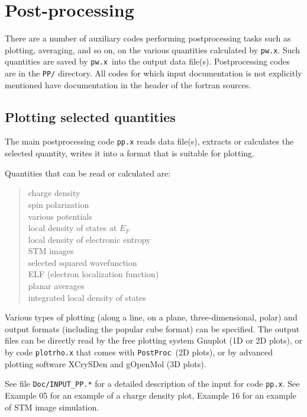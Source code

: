 \documentclass[12pt,a4paper]{article}
\def\pw.x{\texttt{pw.x}}
\def\PostProc{\texttt{PostProc}}
\begin{document}
\section{Post-processing}

There are a number of auxiliary codes performing postprocessing tasks such
as plotting, averaging, and so on, on the various quantities calculated by
\pw.x. Such quantities are saved by \pw.x\ into the output data file(s). 
Postprocessing codes are in the \texttt{PP/} directory. All codes for 
which input documentation is not explicitly mentioned have documentation
in the header of the fortran sources.

\subsection{Plotting selected quantities}
  
The main postprocessing code \texttt{pp.x} reads data file(s), extracts or calculates 
the selected quantity, writes it into a format that is suitable for plotting.

Quantities that can be read or calculated are:
\begin{quote}
      charge density\\
      spin polarization\\
      various potentials\\
      local density of states at $E_F$\\
      local density of electronic entropy\\
      STM images\\
      selected squared wavefunction\\
      ELF (electron localization function)\\
      planar averages\\
      integrated local density of states
\end{quote}
Various types of plotting (along a line, on a plane, three-dimensional, polar)
and output formats (including the popular cube format) can be specified.
The output files can be directly read by the free plotting system Gnuplot
(1D or 2D plots), or by code \texttt{plotrho.x} that comes with \PostProc\ (2D plots),
or by advanced plotting software XCrySDen and gOpenMol (3D plots).

See file \texttt{Doc/INPUT\_PP.*} for a detailed description of the input for code \texttt{pp.x}.
See Example 05 for an example of a charge density plot, Example 16
for an example of STM image simulation.
\end{document}
